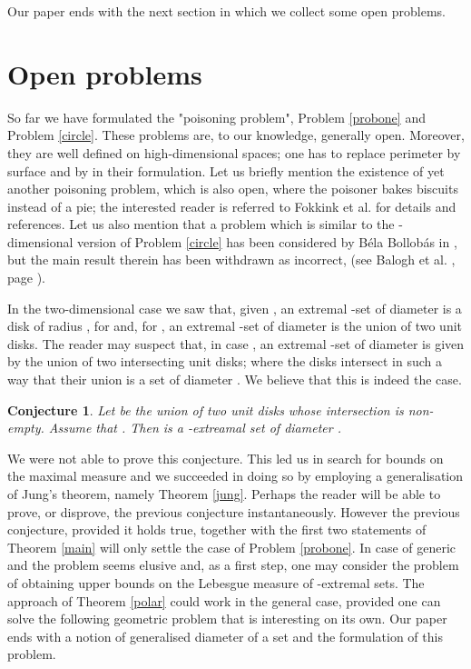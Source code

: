 \documentclass[12pt]{article}
\newtheorem{conj}[thm]{Conjecture}
\begin{document}
Our paper ends with the next section in which  
we collect some open problems.   


\section{Open problems}\label{conjecture}

So far we have formulated the "poisoning problem", Problem \ref{probone} and Problem \ref{circle}. 
These problems are, to our knowledge, 
generally open.  
Moreover, they are well defined on high-dimensional spaces; one has  to
replace perimeter by surface and  by  in their formulation. 
Let us briefly mention the existence of yet another poisoning problem, which is also open, where 
the poisoner bakes biscuits instead of a pie; the interested reader is referred to Fokkink et al. \cite{Fokkink} for 
details and references.  Let us also mention that a problem which is similar to the 
-dimensional version of Problem \ref{circle} 
has been considered by B\'ela Bollob\'as in \cite{Bollobas},  but the main result therein has been withdrawn 
as incorrect, (see Balogh et al. \cite{Balogh}, page ).

In the two-dimensional case we saw that, given ,
an extremal -set of diameter  is a disk of radius , for  and,
for , an extremal -set of diameter  is the union of two unit disks. 
The reader may suspect that, in case 
, an extremal -set of diameter  
is given by the union of two intersecting unit disks; 
where the disks intersect 
in such a way that their union is a set of diameter .  
We believe that this is indeed the case.

\begin{conj} Let  be the union of two unit disks whose intersection is non-empty. Assume that
. Then  is 
a -extreamal set of diameter .
\end{conj}

We were not able to prove this conjecture. This led us in search for bounds on the maximal measure 
and we succeeded in doing so by employing a generalisation of Jung's theorem, namely Theorem \ref{jung}.
Perhaps the reader will be able to prove, or disprove, the previous conjecture instantaneously. 
However the previous conjecture, provided it holds true, together with the first two statements of Theorem 
\ref{main} will only settle the case  of Problem \ref{probone}. In case of generic  and 
 the problem seems elusive and, as a first step, one may consider the problem of obtaining 
upper bounds on the Lebesgue measure of -extremal sets.  
The approach of Theorem \ref{polar} could work in the general case, provided one can 
solve the following geometric problem that is interesting on its own. 
Our paper ends with a notion of generalised diameter of a set and the formulation of this problem. 
\end{document}
